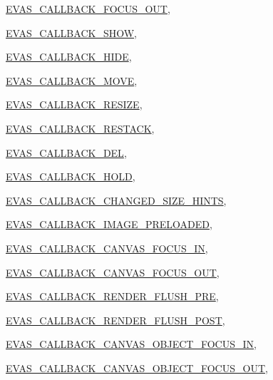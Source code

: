 \begin{DoxyCompactItemize}
\hyperlink{Evas_8h_a99e208e463a20499aabe6faac8a8cb8aab26a0af7efaa8b77e996bd438accf8d3}{EVAS\_\-CALLBACK\_\-FOCUS\_\-OUT}, 
\par
\hyperlink{Evas_8h_a99e208e463a20499aabe6faac8a8cb8aab433c293bd272670ac3b5e8b1928a540}{EVAS\_\-CALLBACK\_\-SHOW}, 
\par
\hyperlink{Evas_8h_a99e208e463a20499aabe6faac8a8cb8aa635d910ff45c89f4d7b91630add35cd7}{EVAS\_\-CALLBACK\_\-HIDE}, 
\par
\hyperlink{Evas_8h_a99e208e463a20499aabe6faac8a8cb8aa9b66bd091da76fb13f551c6db04502b0}{EVAS\_\-CALLBACK\_\-MOVE}, 
\par
\hyperlink{Evas_8h_a99e208e463a20499aabe6faac8a8cb8aa554e3341a4ae95e15d42da495f8adb21}{EVAS\_\-CALLBACK\_\-RESIZE}, 
\par
\hyperlink{Evas_8h_a99e208e463a20499aabe6faac8a8cb8aae633ea84ed0fccd3a3b232d0da30b145}{EVAS\_\-CALLBACK\_\-RESTACK}, 
\par
\hyperlink{Evas_8h_a99e208e463a20499aabe6faac8a8cb8aa4471afbcbb4a754b7b0bbde00fb9a277}{EVAS\_\-CALLBACK\_\-DEL}, 
\par
\hyperlink{Evas_8h_a99e208e463a20499aabe6faac8a8cb8aa585e05307b99c361e54df68a4f341a85}{EVAS\_\-CALLBACK\_\-HOLD}, 
\par
\hyperlink{Evas_8h_a99e208e463a20499aabe6faac8a8cb8aa49764394376bb2128446fe7b2bb2ccae}{EVAS\_\-CALLBACK\_\-CHANGED\_\-SIZE\_\-HINTS}, 
\par
\hyperlink{Evas_8h_a99e208e463a20499aabe6faac8a8cb8aa5cd5ca5f4dcd51dd2429f020cb2dfa9e}{EVAS\_\-CALLBACK\_\-IMAGE\_\-PRELOADED}, 
\par
\hyperlink{Evas_8h_a99e208e463a20499aabe6faac8a8cb8aac3a1defaffac4dcb6fe9e568919c45d1}{EVAS\_\-CALLBACK\_\-CANVAS\_\-FOCUS\_\-IN}, 
\par
\hyperlink{Evas_8h_a99e208e463a20499aabe6faac8a8cb8aa444e79ca91d910d500dc26f71cf0518f}{EVAS\_\-CALLBACK\_\-CANVAS\_\-FOCUS\_\-OUT}, 
\par
\hyperlink{Evas_8h_a99e208e463a20499aabe6faac8a8cb8aa5a68e4f5dccdc18a393ef4a4773236c3}{EVAS\_\-CALLBACK\_\-RENDER\_\-FLUSH\_\-PRE}, 
\par
\hyperlink{Evas_8h_a99e208e463a20499aabe6faac8a8cb8aa4fb1f9e790a22f8e22b63faadf0133c1}{EVAS\_\-CALLBACK\_\-RENDER\_\-FLUSH\_\-POST}, 
\par
\hyperlink{Evas_8h_a99e208e463a20499aabe6faac8a8cb8aa7380ca16bf87762e96309473d3d306c5}{EVAS\_\-CALLBACK\_\-CANVAS\_\-OBJECT\_\-FOCUS\_\-IN}, 
\par
\hyperlink{Evas_8h_a99e208e463a20499aabe6faac8a8cb8aa974f3364f1cee80e98bc5ff3e01d3070}{EVAS\_\-CALLBACK\_\-CANVAS\_\-OBJECT\_\-FOCUS\_\-OUT}, 

\end{DoxyCompactItemize}
